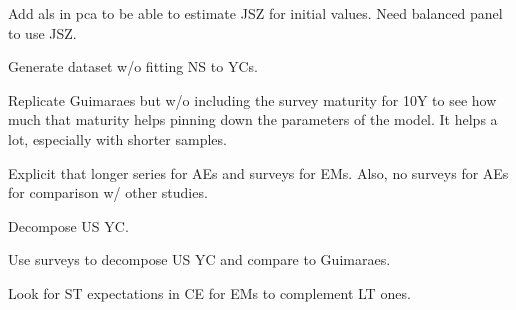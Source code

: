 \documentclass[12pt]{article}
\newcommand{\cmark}{\ding{51}}
\newcommand{\xmark}{\ding{55}}
\newcommand{\done}{\rlap{$\square$}{\raisebox{2pt}{\large\hspace{1pt}\cmark}}%
	\hspace{-2.5pt}}
\newcommand{\wontdo}{\rlap{$\square$}{\large\hspace{1pt}\xmark}}
\begin{document}
\begin{todolist}
	\item[\wontdo] Add als in pca to be able to estimate JSZ for initial values. Need balanced panel to use JSZ.
	\item[\done] Generate dataset w/o fitting NS to YCs.
	\item[\done] Replicate Guimaraes but w/o including the survey maturity for 10Y to see how much that maturity helps pinning down the parameters of the model. It helps a lot, especially with shorter samples.
	\item[\done] Explicit that longer series for AEs and surveys for EMs. Also, no surveys for AEs for comparison w/ other studies. %
	\item[\done] Decompose US YC.
	\item[\done] Use surveys to decompose US YC and compare to Guimaraes.
	\item[\done] Look for ST expectations in CE for EMs to complement LT ones.
\end{todolist}
\end{document}
